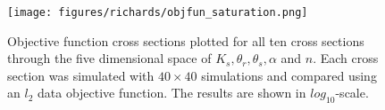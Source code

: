\begin{figure}[ht]
\begin{center}
\texttt{[image: figures/richards/objfun\_saturation.png]}
\end{center}
\caption{
    Objective function cross sections plotted for all ten cross sections through the five dimensional space of
    $K_s, \theta_r, \theta_s, \alpha$ and $n$. Each cross section was simulated with $40 \times 40$ simulations
    and compared using an $l_2$ data objective function. The results are shown in $log_{10}$-scale.
}
\label{fig:richards-objfun-sat}
\end{figure}
